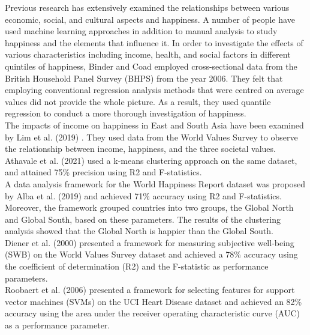 \documentclass[12pt, a4paper, twoside]{report}
\theoremstyle{plain} %
\theoremstyle{definition} %
\theoremstyle{remark} %
\numberwithin{equation}{chapter}
\begin{document}
Previous research \cite{schyns1998crossnational} \cite{diener1994assessing} \cite{cordero2017exploring} has extensively examined the relationships between various economic, social, and cultural aspects and happiness. A number of people have used machine learning approaches in addition to manual analysis to study happiness and the elements that influence it. In order to investigate the effects of various characteristics including income, health, and social factors in different quintiles of happiness, Binder and Coad employed cross-sectional data from the British Household Panel Survey (BHPS) from the year 2006. They felt that employing conventional regression analysis methods that were centred on average values did not provide the whole picture. As a result, they used quantile regression to conduct a more thorough investigation of happiness.\\

The impacts of income on happiness in East and South Asia have been examined by Lim et al. (2019) \cite{lim2020effects}. They used data from the World Values Survey to observe the relationship between income, happiness, and the three societal values. Athavale et al. (2021) \cite{athavale2021application} used a k-means clustering approach on the same dataset, and attained 75\%  precision using R2 and F-statistics.\\

A data analysis framework for the World Happiness Report dataset was proposed by Alba et al. (2019) \cite{alba2019data} and achieved 71\% accuracy using R2 and F-statistics. Moreover, the framework grouped countries into two groups, the Global North and Global South, based on these parameters. The results of the clustering analysis showed that the Global North is happier than the Global South.\\


Diener et al. (2000) presented a framework for measuring subjective well-being (SWB) on the World Values Survey dataset and achieved a 78\% accuracy using the coefficient of determination (R2) and the F-statistic as performance parameters.\\


Roobaert et al. (2006) \cite{roobaert2006information} presented a framework for selecting features for support vector machines (SVMs) on the UCI Heart Disease dataset and achieved an 82\% accuracy using the area under the receiver operating characteristic curve (AUC) as a performance parameter.\\
\end{document}
